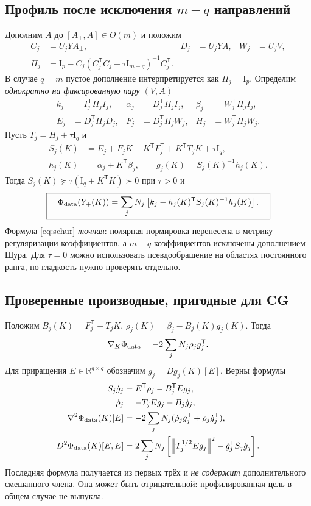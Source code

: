 \documentclass[10.5pt,a4paper]{article}
\newcommand{\R}{\mathbb{R}}
\newcommand{\I}{\mathrm{I}}
\newcommand{\T}{^{\mathsf T}}
\newcommand{\norm}[1]{\left\|#1\right\|}
\numberwithin{equation}{section}
\theoremstyle{plain}
\theoremstyle{definition}
\begin{document}
\subsection{Профиль после исключения $m-q$ направлений}
Дополним $A$ до $[A_\perp,A]\in O(m)$ и положим
\begin{align}
 C_j&=U_jYA_\perp,& D_j&=U_jYA,&W_j&=U_jV,\\
 \Pi_j&=\I_p-C_j(C_j\T C_j+\tau\I_{m-q})^{-1}C_j\T.
 \label{eq:schurPi}
\end{align}
В случае $q=m$ пустое дополнение интерпретируется как $\Pi_j=\I_p$. Определим \emph{однократно на фиксированную пару $(V,A)$}
\begin{align}
 k_j&=I_j\T\Pi_j I_j,&\alpha_j&=D_j\T\Pi_j I_j,&\beta_j&=W_j\T\Pi_j I_j,\\
 E_j&=D_j\T\Pi_jD_j,&F_j&=D_j\T\Pi_jW_j,&H_j&=W_j\T\Pi_jW_j.
 \label{eq:schurstats}
\end{align}
Пусть $T_j=H_j+\tau\I_q$ и
\begin{equation}
 \begin{split}
 S_j(K)&=E_j+F_jK+K\T F_j\T+K\T T_jK+\tau\I_q,\\
 h_j(K)&=\alpha_j+K\T\beta_j,\qquad g_j(K)=S_j(K)^{-1}h_j(K).
 \end{split}\label{eq:S}
\end{equation}
Тогда $S_j(K)\succeq\tau(\I_q+K\T K)\succ0$ при $\tau>0$ и
\begin{equation}
 \boxed{\quad\Phi_{\rm data}(Y_+(K))
 =\sum_jN_j\left[k_j-h_j(K)\T S_j(K)^{-1}h_j(K)\right].\quad}
 \label{eq:schur}
\end{equation}
Формула \eqref{eq:schur} \emph{точная}: полярная нормировка перенесена в метрику регуляризации коэффициентов, а $m-q$ коэффициентов исключены дополнением Шура. Для $\tau=0$ можно использовать псевдообращение на областях постоянного ранга, но гладкость нужно проверять отдельно.

\subsection{Проверенные производные, пригодные для CG}
Положим $B_j(K)=F_j\T+T_jK$, $\rho_j(K)=\beta_j-B_j(K)g_j(K)$. Тогда
\begin{equation}
 \nabla_K\Phi_{\rm data}=-2\sum_jN_j\rho_jg_j\T.
 \label{eq:schurgrad}
\end{equation}
Для приращения $E\in\R^{q\times q}$ обозначим $\dot g_j=Dg_j(K)[E]$. Верны формулы
\begin{align}
 S_j\dot g_j&=E\T\rho_j-B_j\T E g_j,\label{eq:dg}\\
 \dot\rho_j&=-T_jE g_j-B_j\dot g_j,\label{eq:drho}\\
 \nabla^2\Phi_{\rm data}(K)[E]
 &=-2\sum_jN_j(\dot\rho_jg_j\T+\rho_j\dot g_j\T),\label{eq:hvp}\\
 D^2\Phi_{\rm data}(K)[E,E]
 &=2\sum_jN_j\left[\norm{T_j^{1/2}Eg_j}^2-\dot g_j\T S_j\dot g_j\right].
 \label{eq:hessquad}
\end{align}
Последняя формула получается из первых трёх и \emph{не содержит} дополнительного смешанного члена. Она может быть отрицательной: профилированная цель в общем случае не выпукла.
\end{document}
